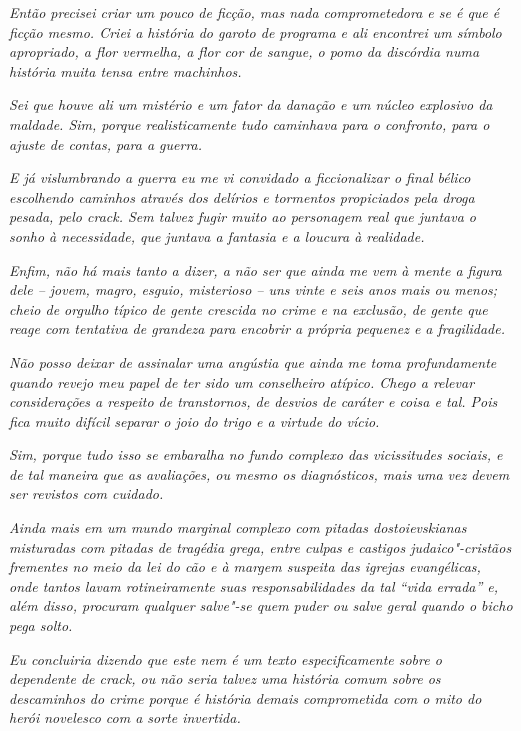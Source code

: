 \emph{Então precisei criar um pouco de ficção, mas nada comprometedora e
se é que é ficção mesmo. Criei a história do garoto de programa e ali
encontrei um símbolo apropriado, a flor vermelha, a flor cor de sangue,
o pomo da discórdia numa história muita tensa entre machinhos.}~

\emph{Sei que houve ali um mistério e um fator da danação e um núcleo
explosivo da maldade. Sim, porque realisticamente tudo caminhava para o
confronto, para o ajuste de contas, para a guerra.}~

\emph{E já vislumbrando a guerra eu me vi convidado a ficcionalizar o
final bélico escolhendo caminhos através dos delírios e tormentos
propiciados pela droga pesada, pelo crack. Sem talvez fugir muito ao
personagem real que juntava o sonho à necessidade, que juntava a
fantasia e a loucura à realidade.}~

\emph{Enfim, não há mais tanto a dizer, a não ser que ainda me vem à
mente a figura dele -- jovem, magro, esguio, misterioso -- uns vinte e
seis anos mais ou menos; cheio de orgulho típico de gente crescida no
crime e na exclusão, de gente que reage com tentativa de grandeza para
encobrir a própria pequenez e a fragilidade.}~

\emph{Não posso deixar de assinalar uma angústia que ainda me toma
profundamente quando revejo meu papel de ter sido um conselheiro
atípico. Chego a relevar considerações a respeito de transtornos, de
desvios de caráter e coisa e tal. Pois fica muito difícil separar o joio
do trigo e a virtude do vício.}~

\emph{Sim, porque tudo isso se embaralha no fundo complexo das
vicissitudes sociais, e de tal maneira que as avaliações, ou mesmo os
diagnósticos, mais uma vez devem ser revistos com cuidado.}~

\emph{Ainda mais em um mundo marginal complexo com pitadas
dostoievskianas misturadas com pitadas de tragédia grega, entre culpas e
castigos judaico"-cristãos frementes no meio da lei do cão e à margem
suspeita das igrejas evangélicas, onde tantos lavam rotineiramente suas
responsabilidades da tal ``vida errada'' e, além disso, procuram
qualquer salve"-se quem puder ou salve geral quando o bicho pega solto.}~

\emph{Eu concluiria dizendo que este nem é um texto especificamente
sobre o dependente de crack, ou não seria talvez uma história comum sobre
os descaminhos do crime porque é história demais comprometida com o mito
do herói novelesco com a sorte invertida.}~


